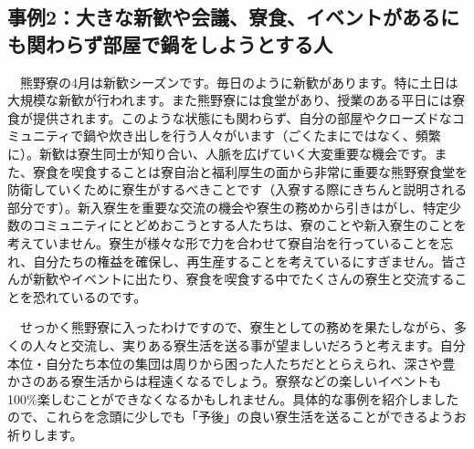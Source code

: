 \subsection{事例2：大きな新歓や会議、寮食、イベントがあるにも関わらず部屋で鍋をしようとする人}
　熊野寮の4月は新歓シーズンです。毎日のように新歓があります。特に土日は大規模な新歓が行われます。また熊野寮には食堂があり、授業のある平日には寮食が提供されます。このような状態にも関わらず、自分の部屋やクローズドなコミュニティで鍋や炊き出しを行う人々がいます（ごくたまにではなく、頻繁に）。新歓は寮生同士が知り合い、人脈を広げていく大変重要な機会です。また、寮食を喫食することは寮自治と福利厚生の面から非常に重要な熊野寮食堂を防衛していくために寮生がするべきことです（入寮する際にきちんと説明される部分です）。新入寮生を重要な交流の機会や寮生の務めから引きはがし、特定少数のコミュニティにとどめおこうとする人たちは、寮のことや新入寮生のことを考えていません。寮生が様々な形で力を合わせて寮自治を行っていることを忘れ、自分たちの権益を確保し、再生産することを考えているにすぎません。皆さんが新歓やイベントに出たり、寮食を喫食する中でたくさんの寮生と交流することを恐れているのです。

　せっかく熊野寮に入ったわけですので、寮生としての務めを果たしながら、多くの人々と交流し、実りある寮生活を送る事が望ましいだろうと考えます。自分本位・自分たち本位の集団は周りから困った人たちだととらえられ、深さや豊かさのある寮生活からは程遠くなるでしょう。寮祭などの楽しいイベントも100\%楽しむことができなくなるかもしれません。具体的な事例を紹介しましたので、これらを念頭に少しでも「予後」の良い寮生活を送ることができるようお祈りします。